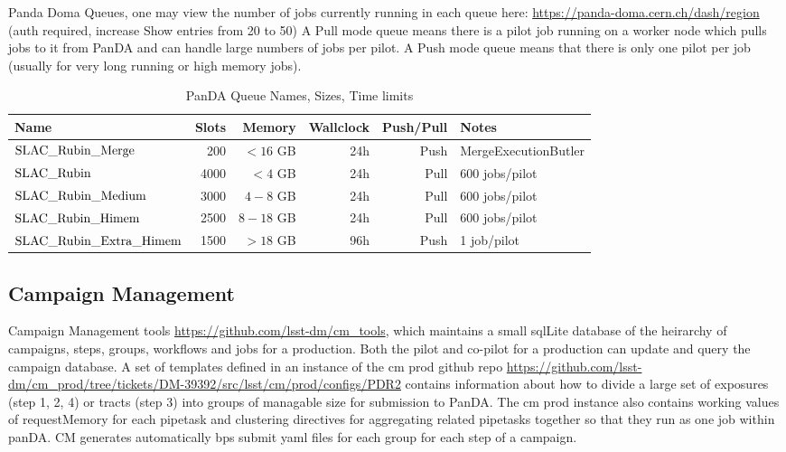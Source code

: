 Panda Doma Queues, one may view the number of jobs currently running in each queue here:
\url{https://panda-doma.cern.ch/dash/region} (auth required, increase Show entries from 20 to 50)
A Pull mode queue means there is a pilot job running on a worker node which pulls jobs to it from PanDA and
can handle large numbers of jobs per pilot.  A Push mode queue means that there is only one pilot per
job (usually for very long running or high memory jobs). 

\normalsize 
\begin{center}
\begin{longtable}{|l|r|r|r|r|l|} 
\caption{PanDA Queue Names, Sizes, Time limits} \label{tab:pandaqueues}\\
\hline 
\textbf{Name}&\textbf{Slots}&\textbf{Memory}&\textbf{Wallclock}&\textbf{Push/Pull}&\textbf{Notes} \\ 
\hline
$\rm SLAC\_Rubin\_Merge$ & 200 & $<16$ GB & 24h & Push & MergeExecutionButler \\
$\rm SLAC\_Rubin$ & 4000 & $<4$ GB & 24h & Pull & 600 jobs/pilot \\
$\rm SLAC\_Rubin\_Medium$ & 3000 & $4-8$ GB & 24h & Pull &  600 jobs/pilot\\
$\rm SLAC\_Rubin\_Himem$ & 2500& $8-18$ GB & 24h & Pull &  600 jobs/pilot \\
$\rm SLAC\_Rubin\_Extra\_Himem$ & 1500 & $>18$ GB & 96h & Push & 1 job/pilot \\
\hline
\end{longtable} 
\end{center}
\normalsize

\subsection{Campaign Management}

Campaign Management tools \url{https://github.com/lsst-dm/cm_tools}, which maintains a small sqlLite 
database of the heirarchy of campaigns, steps, groups, workflows and jobs for a production.
Both the pilot and co-pilot for a production can update and query the campaign database.
A set of templates defined in an instance of the cm prod github repo \url{https://github.com/lsst-dm/cm_prod/tree/tickets/DM-39392/src/lsst/cm/prod/configs/PDR2} contains information about how to divide a large set of
exposures (step 1, 2, 4) or tracts (step 3) into groups of managable size for submission to PanDA.
The cm prod instance also contains working values of requestMemory for each pipetask and clustering
directives for aggregating related pipetasks together so that they run as one job within panDA.
CM generates automatically bps submit yaml files for each group for each step of a campaign.

